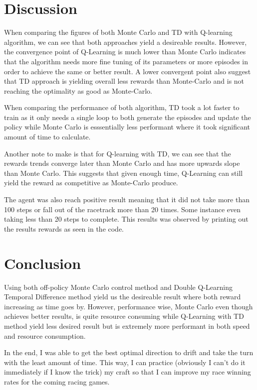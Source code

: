 \documentclass{article}
\begin{document}
\section{Discussion}
When comparing the figures of both Monte Carlo and TD with Q-learning algorithm,
we can see that both approaches yield a desireable results. However, the
convergence point of Q-Learning is much lower than Monte Carlo indicates that
the algorithm needs more fine tuning of its parameters or more episodes in order
to achieve the same or better result. A lower convergent point also suggest that
TD approach is yielding overall less rewards than Monte-Carlo and is not
reaching the optimality as good as Monte-Carlo.

When comparing the performance of both algorithm, TD took a lot faster to train
as it only needs a single loop to both generate the episodes and update the
policy while Monte Carlo is esssentially less performant where it took
significant amount of time to calculate.

Another note to make is that for Q-learning with TD, we can see that the rewards
trends converge later than Monte Carlo and has more upwards slope than Monte
Carlo. This suggests that given enough time, Q-Learning can still yield the
reward as competitive as Monte-Carlo produce.

The agent was also reach positive result meaning that it did
not take more than 100 steps or fall out of the racetrack more than 20 times.
Some instance even taking less than 20 steps to complete. This results was
observed by printing out the results rewards as seen in the code.

\section{Conclusion}
Using both off-policy Monte Carlo control method and Double Q-Learning Temporal
Difference method yield us the desireable result where both reward increasing
as time goes by. However, performance wise, Monte Carlo even though achieves
better results, is quite resource consuming while Q-Learning with TD method
yield less desired result but is extremely more performant in both speed and
resource consumption.

In the end, I was able to get the best optimal direction to drift and take the
turn with the least amount of time. This way, I can practice (obviously
I can't do it immediately if I know the trick) my craft so that I can improve my race
winning rates for the coming racing games.




\end{document}
